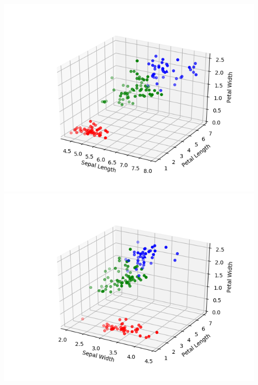 \documentclass[titlepage]{article}
\begin{document}
\begin{enumerate}
		\centerline{}
		\centerline{\includegraphics[scale=0.5]{../slplpw.png} \includegraphics[scale=0.5]{../swplpw.png}}
\end{enumerate}
\end{document}
